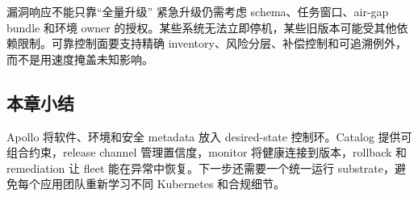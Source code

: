 \begin{warningbox}{漏洞响应不能只靠“全量升级”}
紧急升级仍需考虑 schema、任务窗口、air-gap bundle 和环境 owner 的授权。某些系统无法立即停机，某些旧版本可能受其他依赖限制。可靠控制面要支持精确 inventory、风险分层、补偿控制和可追溯例外，而不是用速度掩盖未知影响。
\end{warningbox}

\subsection{本章小结}

Apollo 将软件、环境和安全 metadata 放入 desired-state 控制环。Catalog 提供可组合约束，release channel 管理置信度，monitor 将健康连接到版本，rollback 和 remediation 让 fleet 能在异常中恢复。下一步还需要一个统一运行 substrate，避免每个应用团队重新学习不同 Kubernetes 和合规细节。


